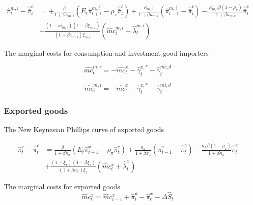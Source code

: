 \documentclass[12pt,oneside,a4paper]{article}
\begin{document}
\begin{equation}
     \begin{aligned}
    \hat{\pi}_{t}^{m, i}-\hat{\bar{\pi}}_{t}^{c} &=+\frac{\beta}{1+\beta \kappa_{m, i}}\left(E_{t} \hat{\pi}_{t+1}^{m, i}-\rho_{\pi} \hat{\bar{\pi}}_{t}^{c}\right)+\frac{\kappa_{m, i}}{1+\beta \kappa_{m, i}}\left(\hat{\pi}_{t-1}^{m, i}-\hat{\bar{\pi}}_{t}^{c}\right)-\frac{\kappa_{m, i} \beta\left(1-\rho_{\pi}\right)}{1+\beta \kappa_{m, i}} \hat{\bar{\pi}}_{t}^{c} \\
    &+\frac{\left(1-xi_{m, i}\right)\left(1-\beta \xi_{m, i}\right)}{\left(1+\beta x_{m, i}\right) \xi_{m, i}}\left(\hat{m} c_{t}^{m, i}+\hat{\lambda}_{t}^{m, i}\right)
    \end{aligned}
\end{equation}

The marginal costs for consumption and investment good importers

\begin{equation}
    \widehat{m c}_{t}^{m, c}=-\widehat{m c}_{t}^{x}-\hat{\gamma}_{t}^{x, *}-\hat{\gamma}_{t}^{m c, d}
\end{equation}

\begin{equation}
    \widehat{m c}_{t}^{m, i}=-\widehat{m c}_{t}^{x}-\hat{\gamma}_{t}^{x, *}-\hat{\gamma}_{t}^{m i, d}
\end{equation}

\subsubsection*{Exported goods}
The New Keynesian Phillips curve of exported goods

\begin{equation}
    \begin{aligned}
\hat{\pi}_{t}^{x} - \hat{\bar{\pi}}_{t}^{c} &=\frac{\beta}{1+\beta \kappa_{x}}\left(E_{t} \hat{\pi}_{t+1}^{x}-\rho_{\pi} \hat{\pi}_{t}^{c}\right)+\frac{\kappa_{x}}{1+\beta x_{x}}\left(\hat{\pi}_{t-1}^{x}-\hat{\bar{\pi}}_{t}^{c}\right)-\frac{\kappa_{x} \beta\left(1-\rho_{\pi}\right)}{1+\beta \kappa_{x}} \hat{\bar{\pi}}_{t}^{c} \\
&+\frac{\left(1-\xi_{x}\right)\left(1-\beta \xi_{x}\right)}{\left(1+\beta \kappa_{x}\right) \xi_{x}}\left(\hat{m} c_{t}^{x}+\hat{\lambda}_{t}^{x}\right)
\end{aligned}
\end{equation}

The marginal costs for exported goods
\begin{equation}
    \hat{m} c_{t}^{x}=\hat{m} c_{t-1}^{x}+\hat{\pi}_{t}^{d}-\hat{\pi}_{t}^{x}-\Delta \hat{S}_{t}
\end{equation}
\end{document}
